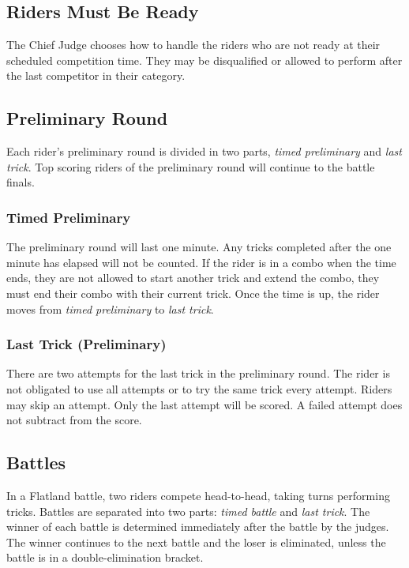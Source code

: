\subsection{Riders Must Be Ready}
The Chief Judge chooses how to handle the riders who are not ready at their scheduled competition time.
They may be disqualified or allowed to perform after the last competitor in their category.

\subsection{Preliminary Round}
Each rider's preliminary round is divided in two parts, \textit{timed preliminary} and \textit{last trick}.
Top scoring riders of the preliminary round will continue to the battle finals.

\subsubsection{Timed Preliminary}
The preliminary round will last one minute.
Any tricks completed after the one minute has elapsed will not be counted.
If the rider is in a combo when the time ends, they are not allowed to start another trick and extend the combo, they must end their combo with their current trick.
Once the time is up, the rider moves from \textit{timed preliminary} to \textit{last trick}.

\subsubsection{Last Trick (Preliminary)}
There are two attempts for the last trick in the preliminary round.
The rider is not obligated to use all attempts or to try the same trick every attempt.
Riders may skip an attempt. Only the last attempt will be scored.
A failed attempt does not subtract from the score.

\subsection{Battles}
In a Flatland battle, two riders compete head-to-head, taking turns performing tricks.
Battles are separated into two parts: \textit{timed battle} and \textit{last trick}.
The winner of each battle is determined immediately after the battle by the judges.
The winner continues to the next battle and the loser is eliminated, unless the battle is in a double-elimination bracket.

